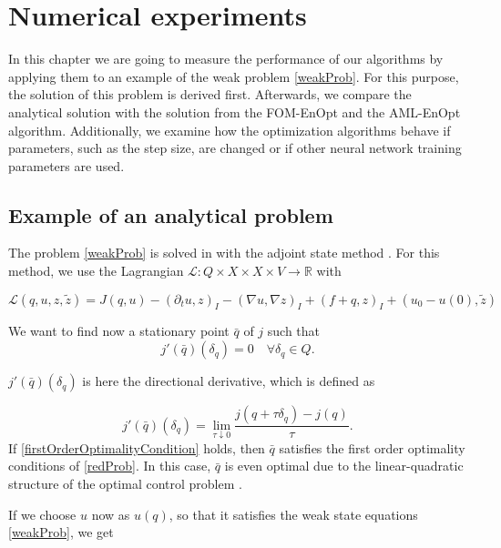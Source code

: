 \chapter{Numerical experiments}

In this chapter we are going to measure the performance of our algorithms by applying them to an example of the weak problem \eqref{weakProb}. For this purpose, the solution of this problem is derived first. Afterwards, we compare the analytical solution with the solution from the FOM-EnOpt and the AML-EnOpt algorithm. Additionally, we examine how the optimization algorithms behave if parameters, such as the step size, are changed or if other neural network training parameters are used.

\section{Example of an analytical problem}

The problem \eqref{weakProb} is solved in \cite{doi:10.1137/070694016} with the adjoint state method \cite{Plessix2006ARO,Becker2007}. For this method, we use the Lagrangian $\mathcal{L}:Q\times X\times X \times V\to\mathbb{R}$ with

\begin{equation}
\label{lagrangian}
\mathcal{L}(q,u,z,\tilde{z})=J(q,u)-(\partial_tu,z)_I-(\nabla u, \nabla z)_I+(f+q, z)_I + (u_0-u(0), \tilde{z})
\end{equation}

We want to find now a stationary point $\bar{q}$ of $j$ such that
\begin{equation}
\label{firstOrderOptimalityCondition}
j'(\bar{q})(\delta_q)=0\quad\forall \delta_q\in Q.
\end{equation}

$j'(\bar{q})(\delta_q)$ is here the directional derivative, which is defined as

\begin{displaymath}
j'(\bar{q})(\delta_q)=\lim_{\tau\downarrow0}\frac{j(q+\tau\delta_q)-j(q)}{\tau}.
\end{displaymath}
If \eqref{firstOrderOptimalityCondition} holds, then $\bar{q}$ satisfies the first order optimality conditions of \eqref{redProb}. In this case, $\bar{q}$ is even optimal due to the linear-quadratic structure of the optimal control problem \cite{doi:10.1137/070694016}.

If we choose $u$ now as $u(q)$, so that it satisfies the weak state equations \eqref{weakProb}, we get

